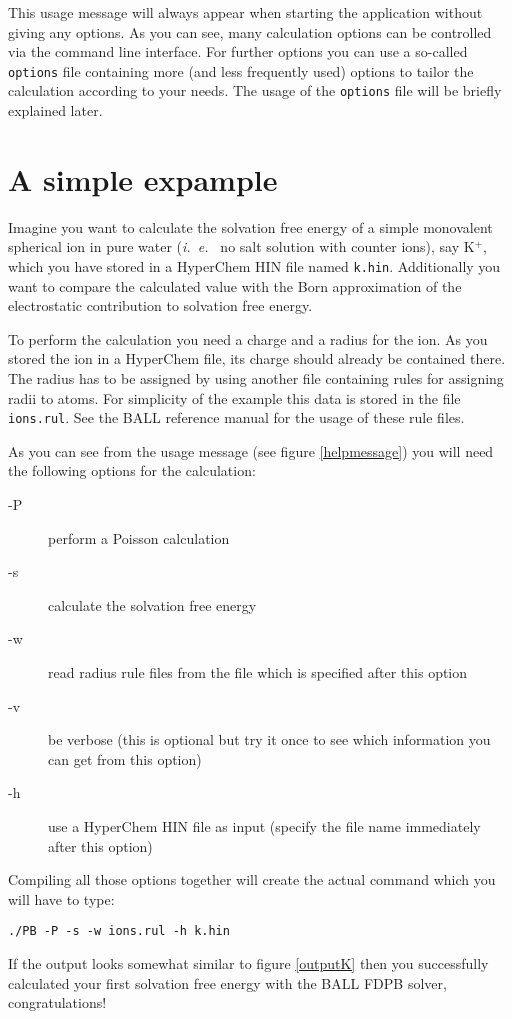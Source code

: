 \documentclass[12pt,twoside,a4paper]{article}
\begin{document}
This usage message will always appear when starting the application without
giving any options. As you can see, many calculation options can be
controlled via the command line interface. For further options you can use
a so-called {\tt options} file containing more (and less frequently used)
options to tailor the calculation according to your needs. The usage of the
{\tt options} file will be briefly explained later.


\section{A simple expample}

Imagine you want to calculate the solvation free energy of a simple
monovalent spherical ion in pure water (\textit{i.~e.~} no salt solution
with counter ions), say K$^+$, which you have stored in a HyperChem HIN
file named {\tt k.hin}. Additionally you want to compare the calculated
value with the Born approximation of the electrostatic contribution to
solvation free energy.

To perform the calculation you need a charge and a radius for the ion. As
you stored the ion in a HyperChem file, its charge should already be
contained there. The radius has to be assigned by using another file
containing rules for assigning radii to atoms. For simplicity of the
example this data is stored in the file {\tt ions.rul}. See the BALL
reference manual for the usage of these rule files.

As you can see from the usage message (see figure \ref{helpmessage}) you
will need the following options for the calculation:
\begin{description}
\item[-P] perform a Poisson calculation
\item[-s] calculate the solvation free energy
\item[-w] read radius rule files from the file which is specified after
this option
\item[-v] be verbose (this is optional but try it once to see which
information you can get from this option)
\item[-h] use a HyperChem HIN file as input (specify the file name
immediately after this option)
\end{description}

Compiling all those options together will create the actual command which
you will have to type:
\begin{verbatim}
./PB -P -s -w ions.rul -h k.hin
\end{verbatim}
If the output looks somewhat similar to figure \ref{outputK} then you
successfully calculated your first solvation free energy with the BALL FDPB
solver, congratulations!
\end{document}
